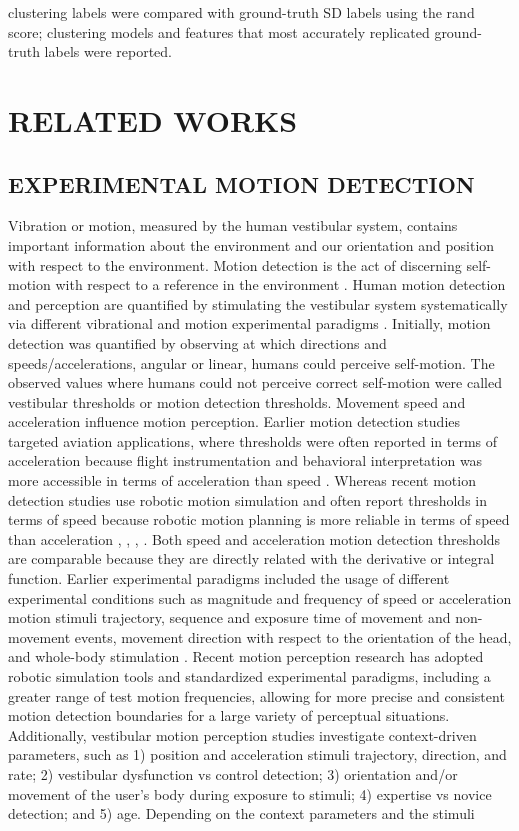 \documentclass{ieeeaccess}
\begin{document}
clustering labels were compared with ground-truth SD labels using the rand score; clustering models and features that most accurately replicated ground-truth labels were reported.


\section{RELATED WORKS}

\subsection{EXPERIMENTAL MOTION DETECTION}
Vibration or motion, measured by the human vestibular system, contains important information about the environment and our orientation and position with respect to the environment. Motion detection is the act of discerning self-motion with respect to a reference in the environment \cite{Chaudhuri_2013_Wholebody}. Human motion detection and perception are quantified by stimulating the vestibular system systematically via different vibrational and motion experimental paradigms \cite{Angelaki_2008_Vestibular}. Initially, motion detection was quantified by observing at which directions and speeds/accelerations, angular or linear, humans could perceive self-motion. The observed values where humans could not perceive correct self-motion were called vestibular thresholds or motion detection thresholds. Movement speed and acceleration influence motion perception. Earlier motion detection studies targeted aviation applications, where thresholds were often reported in terms of acceleration because flight instrumentation and behavioral interpretation was more accessible in terms of acceleration than speed \cite{Melvill_1978_Vertical}. Whereas recent motion detection studies use robotic motion simulation and often report thresholds in terms of speed because robotic motion planning is more reliable in terms of speed than acceleration \cite{BermudezRey_2016_Vestibular}, \cite{Hartmann_2014_Direction}, \cite{Karmali_2017_Multivariate}, \cite{Valko_2012_Vestibular}. Both speed and acceleration motion detection thresholds are comparable because they are directly related with the derivative or integral function. Earlier experimental paradigms included the usage of different experimental conditions such as magnitude and frequency of speed or acceleration motion stimuli trajectory, sequence and exposure time of movement and non-movement events, movement direction with respect to the orientation of the head, and whole-body stimulation \cite{Melvill_1978_Vertical}. Recent motion perception research has adopted robotic simulation tools and standardized experimental paradigms, including a greater range of test motion frequencies, allowing for more precise and consistent motion detection boundaries for a large variety of perceptual situations. Additionally, vestibular motion perception studies investigate context-driven parameters, such as 1) position and acceleration stimuli trajectory, direction, and rate; 2) vestibular dysfunction vs control detection; 3) orientation and/or movement of the user's body during exposure to stimuli; 4) expertise vs novice detection; and 5) age. Depending on the context parameters and the stimuli 
\end{document}
